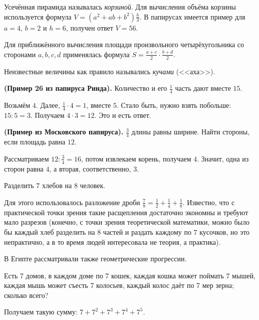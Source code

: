 \documentclass[a4paper,oneside,fleqn,10pt]{article}
\begin{document}
Усечённая пирамида называлась \emph{корзиной}.
Для вычисления объёма корзины используется формула
$V = (a^2 + ab + b^2) \frac h3$. В папирусах имеется
пример для $a =4$, $b=2$ и $h = 6$, получен ответ $V = 56$.


Для приближённого вычисления площади произвольного четырёхугольника
со сторонами $a, b,c,d$ применялась формула $S = \frac{a+c}{2} \cdot \frac{b+d}{2}$.

Неизвестные величины как правило назывались \emph{кучами} (<<аха>>).

\begin{ex} \textbf{(Пример 26 из папируса Ринда).}
Количество и его $\frac14$ часть дают вместе $15$.
\end{ex}

\begin{solution}
Возьмём $4$. Далее, $\frac14 \cdot 4 = 1$, вместе $5$.
Стало быть, нужно взять побольше: $15:5 = 3$. Получаем $4 \cdot 3 = 12$.
Это и есть ответ.
\end{solution}

\begin{ex} \textbf{(Пример из Московского папируса).}
$\frac34$ длины равны ширине. Найти стороны,
если площадь равна $12$.
\end{ex}
\begin{solution}
Рассматриваем $12:\frac34 = 16$, потом извлекаем корень,
получаем $4$. Значит, одна из сторон равна $4$, а вторая, соответственно, $3$.
\end{solution}

\begin{ex}
Разделить $7$ хлебов на $8$ человек.
\end{ex}
\begin{solution}
Для этого использовалось
разложение дроби $\frac78 = \frac12+\frac14+\frac18$. Известно, что с практической
точки зрения такие расщепления достаточно экономны и требуют мало разрезов
(конечно, с точки зрения теоретической математики, можно было бы каждый хлеб
разделить на $8$ частей и раздать каждому по $7$ кусочков, но это непрактично,
а в то время людей интересовала не теория, а практика).
\end{solution}

В Египте рассматривали также геометрические прогрессии.
\begin{problem}
Есть 7 домов, в каждом доме по 7 кошек, каждая кошка
может поймать 7 мышей, каждая мышь может съесть 7 колосьев, каждый колос
даёт по 7 мер зерна; сколько всего?
\end{problem}
Получаем такую сумму: $7 + 7^2 + 7^3 + 7^4 + 7^5$.
\end{document}
